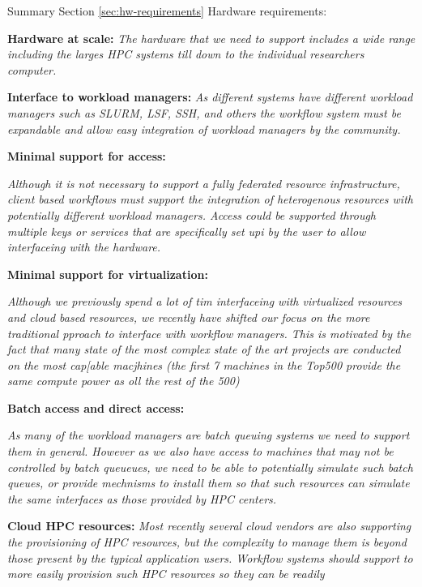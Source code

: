 \documentclass[utf8]{FrontiersinVancouver} %
\begin{document}
\begin{tcolorbox}[breakable]
Summary Section \ref{sec:hw-requirements} Hardware requirements:

\begin{itemize}
\item {\bf Hardware at scale:} {\it The hardware that we need to
    support includes a wide range including the larges HPC systems
    till down to the individual researchers computer.}
\item {\bf Interface to workload managers:} {\it As different systems
    have different workload managers such as SLURM, LSF, SSH, and
    others the workflow system must be expandable and allow easy
    integration of workload managers by the community.}  
\item {\bf Minimal support for access:} {\it Although it is not
    necessary to support a fully federated resource infrastructure,
    client based workflows must support the integration of
    heterogenous resources with potentially different workload
    managers. Access could be supported through multiple keys or
    services that are specifically set upi by the user to allow
    interfaceing with the hardware.
\item {\bf Minimal support for virtualization:} {\it Although we
    previously spend a lot of tim interfaceing with virtualized
    resources and cloud based resources, we recently have shifted our
    focus on the more traditional pproach to interface with workflow
    managers. This is motivated by the fact that many state of the
    most complex state of the art projects are conducted on the most
    cap[able macjhines (the first 7 machines in the Top500 provide the
    same compute power as oll the rest of the 500)
\item {\bf Batch access and direct access:} {\it As many of the
    workload managers are batch queuing systems we need to support
    them in general. However as we also have access to machines that
    may not be controlled by batch queueues, we need to be able to
    potentially simulate such batch queues, or provide mechnisms to
    install them so that such resources can simulate the same
    interfaces as those provided by HPC centers.
 \item {\bf Cloud HPC resources:} {\it Most recently several cloud
     vendors are also supporting the provisioning of HPC resources,
     but the complexity to manage them is beyond those present by the
     typical application users. Workflow systems should support to
     more easily provision such HPC resources so they can be readily
}}}}
\end{itemize}
\end{tcolorbox}
\end{document}
